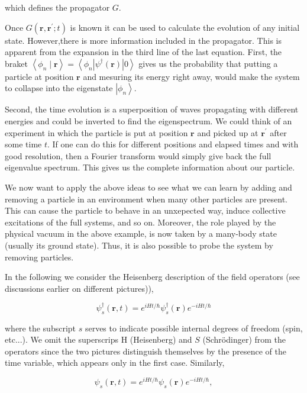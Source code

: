 which defines the propagator $G$.

 Once $G\left(\mathbf{r}, \mathbf{r}^{\prime} ; t\right)$
 is known it can be used to calculate the evolution of any initial
 state. However,there is more information included in the
 propagator. This is apparent from the expansion in the third line of the last equation.
 First, the braket $\left\langle\phi_{n} \mid
 \mathbf{r}\right\rangle=\left\langle\phi_{n}\left|\psi^{\dagger}(\mathbf{r})\right|
 0\right\rangle$ gives us the probability that putting a particle at
 position $\mathbf{r}$ and mesuring its energy right away, would make
 the system to collapse into the eigenstate
 $\left|\phi_{n}\right\rangle$.

 Second, the time evolution is a
 superposition of waves propagating with different energies and could
 be inverted to find the eigenspectrum. We could think of  an experiment in
 which the particle is put at position $\mathbf{r}$ and picked up at
 $\mathbf{r}^{\prime}$ after some time $t$. If one can do this for
 different positions and elapsed times and with good resolution, then a
 Fourier transform would simply give back the full eigenvalue
 spectrum. This  gives us the complete information about our particle.

We now want to apply the above ideas to see what we can learn by
adding and removing a particle in an environment when many other particles are
present. This can cause the particle to behave in an unxepected way,
induce collective excitations of the full systems, and so
on. Moreover, the role played by the physical vacuum in the above
example, is now taken by a many-body state (usually its ground
state). Thus, it is also possible to probe the system by removing
particles.


In the following we consider the Heisenberg description of the field operators (see discussions earlier on different pictures)),

$$
\psi_{s}^{\dagger}(\mathbf{r}, t)=e^{i H t / \hbar} \psi_{s}^{\dagger}(\mathbf{r}) e^{-i H t / \hbar}
$$

where the subscript $s$ serves to indicate possible internal degrees of freedom (spin, etc...). We omit the superscrips $\mathrm{H}$ (Heisenberg) and $S$ (Schr\"odinger) from the operators since the two pictures distinguish themselves by  the presence of the time variable, which appears only in the first case. Similarly,

$$
\psi_{s}(\mathbf{r}, t)=e^{i H t / \hbar} \psi_{s}(\mathbf{r}) e^{-i H t / \hbar},
$$


